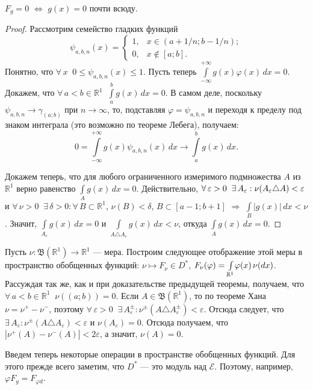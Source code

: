 \documentclass[10pt,titlepage, a4paper]{article}
\begin{document}
\lecture

\begin{predl}
$F_g=0$ $\Leftrightarrow$ $g(x)=0$ почти всюду.
\end{predl}

\begin{proof}
Рассмотрим семейство гладких функций $$ \psi_{a,b,n}(x)=
\begin{cases}
1,&\text{$x\in(a+1/n; b-1/n)$};\\
0,&\text{$x\not\in[a;b]$}.
\end{cases}$$
Понятно, что $\forall\,x\;\; 0\leqslant\psi_{a,b,n}(x)\leqslant1$.
Пусть теперь
$\int\limits_{-\infty}^{+\infty}\!g(x)\varphi(x)\,dx=0$. Докажем,
что $\forall\,a<b\in\mathbb{R}^1\;\;\int\limits_{a}^b\!g(x)\,dx=0$.
В самом деле, поскольку $\psi_{a,b,n}\to\gamma_{(a;b)}$ при
$n\to\infty$, то, подставляя $\varphi=\psi_{a,b,n}$ и переходя к
пределу под знаком интеграла (это возможно по теореме Лебега),
получаем:
$$0=\int\limits_{-\infty}^{+\infty}\!g(x)\psi_{a,b,n}(x)\,dx\to\int\limits_a^b\!
g(x)\,dx.$$

Докажем теперь, что для любого ограниченного измеримого подмножества
$A$ из $\mathbb{R}^1$ верно равенство $\int\limits_A\!g(x)\,dx=0$.
Действительно,
$\forall\,\varepsilon\p>0\;\;\exists\,A_\varepsilon:\nu(A_\varepsilon\triangle
A)<\varepsilon$ и
$\forall\,\nu>0\;\;\exists\,\delta>0:\forall\,B\subset
\mathbb{R}^1$, $\nu(B)<\delta$, $B\subset[a-1;b+1]$ $\Rightarrow$
$\int\limits_{B}\!|g(x)|\,dx<\nu$. Значит,
$\int\limits_{A_\varepsilon}\!g(x)\,dx=0$ и $\int\limits_{A\triangle
A_\varepsilon}\!g(x)\,dx<\nu$, откуда $\int\limits_A\!g(x)\,dx=0$.
\end{proof}

Пусть $\nu\colon\mathfrak{B}(\mathbb{R}^1)\to\mathbb{R}^1$ --- мера.
Построим следующее отображение этой меры в пространство обобщенных
функций: $\nu\mapsto F_\nu\in D^*$,
$F_\nu(\varphi)\p=\int\limits_{\mathbb{R}^1}\!\varphi(x)\,\nu(dx)$.
Рассуждая так же, как и при доказательстве предыдущей теоремы,
получаем, что $\forall\,a<b\in\mathbb{R}^1\;\;\nu((a;b))=0$. Если
$A\in\mathfrak{B}(\mathbb{R}^1)$, то по теореме Хана
$\nu=\nu^+-\nu^-$, поэтому
$\forall\,\varepsilon>0\;\;\exists\,A^{\pm}_\varepsilon:\nu^\pm(A\triangle
A^\pm_\varepsilon)<\varepsilon$. Отсюда следует, что
$\exists\,A_\varepsilon:\nu^\pm(A\triangle
A_\varepsilon)<\varepsilon$ и $\nu(A_\varepsilon)=0$. Отсюда
получаем, что $|\nu^+(A)-\nu^-(A)|<2\varepsilon$, а значит,
$\nu(A)=0$.

Введем теперь некоторые операции в пространстве обобщенных
фун\-кций. Для этого прежде всего заметим, что $D^*$ --- это модуль
над $\mathcal{E}$. Поэтому, например, $\varphi F_g=F_{\varphi d}$.
\end{document}
